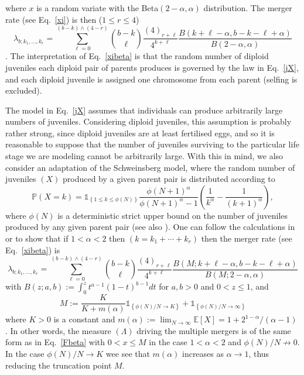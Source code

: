 \documentclass{article}
\newcommand{\be}{\begin{equation}}
\newcommand{\ee}{\end{equation}}
\newcommand{\EE}[1]{\ensuremath{\mathds{E}\left[ #1 \right]}}%
\newcommand{\one}[1]{\ensuremath{\mathds{1}_{\left\{ #1 \right\}}}}%
\newcommand{\prb}[1]{\ensuremath{\mathds{P}\left( #1 \right) } }%
\begin{document}
where $x$ is a random variate with  the Beta$(2-\alpha,\alpha)$ distribution.  
The merger rate (see Eq.\ \eqref{xi}) is then ($1 \le r \le 4$)
\be\label{xibeta}
   \lambda_{b;k_1, \ldots, k_r} = \sum_{\ell = 0}^{ (b - k)\wedge (4-r) } \binom{b-k}{\ell} \frac{ (4)_{r+\ell} }{4^{k+\ell}} \frac{B(k+\ell - \alpha, b-k-\ell + \alpha ) }{B(2-\alpha,\alpha)}
\ee
\citep{Blath2016,BLS15}. The interpretation of Eq.\ \eqref{xibeta} is  that the random   number of diploid  juveniles each  diploid pair of parents  produces  is  governed by  the law in Eq.\ \eqref{jX},   and   each diploid juvenile  is assigned  one chromosome  from each parent (selfing is excluded).   



The model in Eq.\ \eqref{jX} assumes that individuals can produce
arbitrarily large numbers of juveniles. Considering diploid juveniles,
this assumption is probably rather strong, since diploid juveniles are
at least fertilised eggs, and so it is reasonable to suppose that the
number of juveniles surviving to the  particular life stage we are modeling  cannot be
arbitrarily large.  With this in mind, we also consider an adaptation
of the Schweinsberg model, where the random number of juveniles $(X)$
produced by a   given parent pair  is distributed according to
\be\label{jtr}
  \prb{X=k} =   \one{1 \le k \le \phi(N)} \frac{\phi(N+1)^\alpha }{ \phi(N+1)^\alpha - 1 }  \left( \frac{1}{k^\alpha} - \frac{1}{(k+1)^\alpha}  \right),
\ee
where $\phi(N)$ is a deterministic strict upper bound on the number of juveniles produced by  any given parent pair (see also \citep{Eldon2018}). 
One can follow the calculations in  \citep{schweinsberg03} or \citep{BLS15}  to show  that 
if $1 < \alpha < 2$   then  $(k = k_1 + \cdots + k_r)$ then the merger rate (see Eq.\ \eqref{xibeta}) is
\be
   \lambda_{b;k_1, \ldots, k_r} =  \sum_{\ell = 0}^{ (b - k)\wedge (4-r) } \binom{b-k}{\ell} \frac{ (4)_{r+\ell} }{4^{k+\ell}} \frac{B(M; k+\ell - \alpha, b-k-\ell + \alpha ) }{B(M;2-\alpha,\alpha)}
\ee
with $B(z;a,b) := \int_0^z t^{a-1}(1-t)^{b-1}dt$ for  $a,b>0$ and $0< z\le 1$, and
\be
M :=  \frac{K}{K+m(\alpha)} \one{\phi(N)/N \to K} + \one{\phi(N)/N \to \infty }
\ee
where $K > 0$ is a constant and  $m(\alpha) := \lim_{N\to \infty} \EE{X} = 1 + 2^{1-\alpha}/(\alpha - 1)$ \citep{CDEE2020,AEKKZ2020}.   
In other words,  the measure $(\Lambda)$ driving the multiple mergers is of the same form as in Eq.\ \eqref{Fbeta} 
with $0 < x \le M$ in the case $1 < \alpha < 2$ and $\phi(N)/N \not\to 0$.  
In the case $\phi(N)/N \to K$  wee see that  $m(\alpha)$ increases as $\alpha \to 1$, 
thus reducing the  truncation point $M$.   
\end{document}

